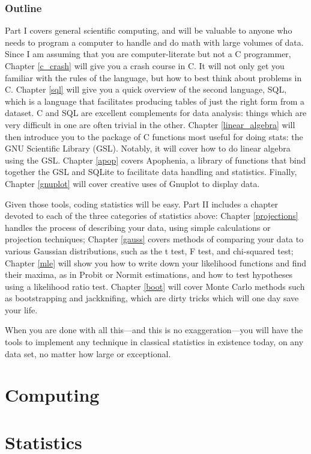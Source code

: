 \documentclass[12pt,notitlepage, openany]{book}
\begin{document}
\section{Outline} 
Part I covers general scientific computing, and will be valuable to
anyone who needs to program a computer to handle and do math with large volumes of data.
Since I am assuming that you are computer-literate but
not a C programmer, Chapter \ref{c_crash} will give you a crash course
in C. It will not only get you familiar with the rules of the language,
but how to best think about problems in C. 
Chapter \ref{sql} will give you a quick overview of the second language,
SQL, which is a language that facilitates
producing tables of just the right form from a dataset. C and SQL are
excellent complements for data analysis: things which are very difficult
in one are often trivial in the other.
Chapter \ref{linear_algebra}
will then introduce you to the package of C functions most useful for
doing stats: the GNU Scientific Library (GSL). Notably, it will cover
how to do linear algebra using the GSL. Chapter \ref{apop} covers
Apophenia, a library of functions that bind together the GSL and SQLite
to facilitate data handling and statistics. Finally, Chapter
\ref{gnuplot} will cover creative uses of Gnuplot to display data.


Given those tools, coding statistics will be easy. Part II includes a chapter
devoted to each of the three categories of statistics above: Chapter \ref{projections}
handles the process of describing your data, using simple calculations
or projection techniques; Chapter
\ref{gauss} covers methods of comparing your data to various Gaussian
distributions, such as the t test, F test, and chi-squared test; Chapter
\ref{mle} will show you how to write down your likelihood functions and
find their maxima, as in Probit or Normit estimations, and how to test
hypotheses using a likelihood ratio test. Chapter \ref{boot} will cover
Monte Carlo methods such as 
bootstrapping and jackknifing, which are dirty tricks which will one
day save your life.  

When you are done with all this---and this is no exaggeration---you will
have the tools to implement any technique in classical statistics in
existence today, on any data set, no matter how large or exceptional.

\part{Computing}





\part{Statistics}




%
\citeindexfalse
\nocite{*}
\backmatter


\printindex
\end{document}
